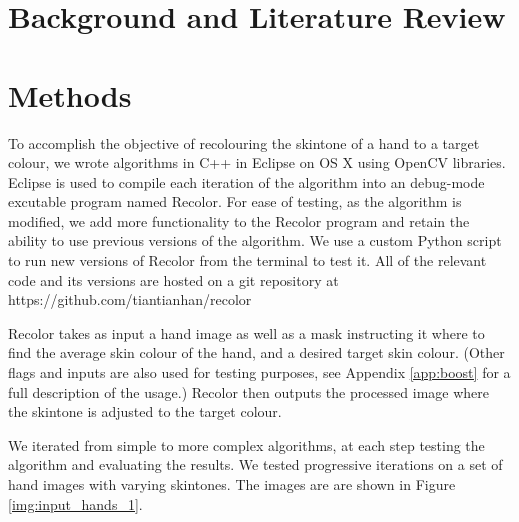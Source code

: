 \documentclass[12pt, a4paper]{article}
\begin{document}
\tableofcontents
\pagebreak

\listoffigures
\listoftables
\pagebreak

\section{Background and Literature Review}

\pagebreak

\section{Methods}
To accomplish the objective of recolouring the skintone of a hand to a target colour, we wrote algorithms in C++ in Eclipse on OS X using OpenCV libraries. Eclipse is used to compile each iteration of the algorithm into an debug-mode excutable program named Recolor. For ease of testing, as the algorithm is modified, we add more functionality to the Recolor program and retain the ability to use previous versions of the algorithm. We use a custom Python script to run new versions of Recolor from the terminal to test it. All of the relevant code and its versions are hosted on a git repository at https://github.com/tiantianhan/recolor

Recolor takes as input a hand image as well as a mask instructing it where to find the average skin colour of the hand, and a desired target skin colour. (Other flags and inputs are also used for testing purposes, see Appendix \ref{app:boost} for a full description of the usage.) Recolor then outputs the processed image where the skintone is adjusted to the target colour.

We iterated from simple to more complex algorithms, at each step testing the algorithm and evaluating the results. We tested progressive iterations on a set of hand images with varying skintones. The images are are shown in Figure \ref{img:input_hands_1}.

\end{document}
